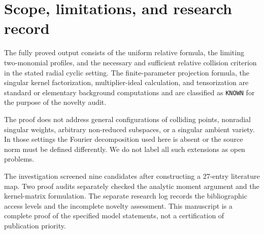 \documentclass[12pt]{amsart}
\theoremstyle{definition}
\theoremstyle{remark}
\numberwithin{equation}{section}
\theoremstyle{definition}
\begin{document}
\section{Scope, limitations, and research record}
The fully proved output consists of the uniform relative formula,
the limiting two-monomial profiles, and the necessary and sufficient
relative collision criterion in the stated radial cyclic setting.
The finite-parameter projection formula, the singular kernel
factorization, multiplier-ideal calculation, and tensorization are
standard or elementary background computations and are classified
as \texttt{KNOWN} for the purpose of the novelty audit.

The proof does not address general configurations of colliding points,
nonradial singular weights, arbitrary non-reduced subspaces, or a
singular ambient variety. In those settings the Fourier decomposition
used here is absent or the source norm must be defined differently.
We do not label all such extensions as open problems.

The investigation screened nine candidates after constructing a
27-entry literature map. Two proof audits separately checked the
analytic moment argument and the kernel-matrix formulation. The
separate research log records the bibliographic access levels and
the incomplete novelty assessment. This manuscript is a complete
proof of the specified model statements, not a certification of
publication priority.



\end{document}
